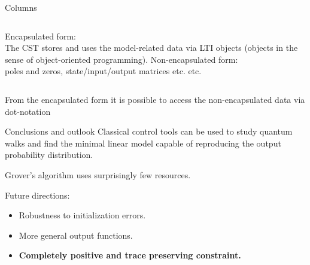 \documentclass[11pt,aspectratio=169,t]{beamer}
\begin{document}
    \begin{frame}{Columns}
        \vfill
        \bigskip
        \begin{columns}
        \alert{Encapsulated form:}\\
        The CST stores and uses the model-related data via LTI objects (objects in the sense of object-oriented programming). 
        \alert{Non-encapsulated form:}\\
        poles and zeros, state/input/output matrices etc. etc.
        \end{columns}
        \bigskip
        From the encapsulated form it is possible to access the non-encapsulated data via dot-notation

    \vfill
    \end{frame}


\begin{frame}{Conclusions and outlook} 
\vfill 
Classical control tools can be used to study quantum walks and find the minimal linear model capable of reproducing the output probability distribution.

Grover's algorithm uses surprisingly few resources.\bigskip

Future directions:
\begin{itemize}
    \item Robustness to initialization errors. 
    \item More general output functions. 
    \item \textbf{\color{UNIPDred}Completely positive and trace preserving constraint.}
\end{itemize}

\vfill
\end{frame}
\end{document}
